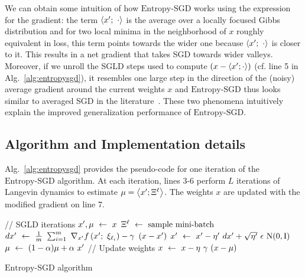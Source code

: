 \documentclass[10pt]{article}
\newcommand{\entropysgd}{\mathrm{Entropy}\textrm{-}\mathrm{SGD}}
\newcommand{\minibatch}[1]{\Xi^{#1}}
\begin{document}
We can obtain some intuition of how $\entropysgd$ works using the expression for the gradient: the term $\left\langle x';\ \cdot\right\rangle$ is the average over a locally focused Gibbs distribution and for two local minima in the neighborhood of $x$ roughly equivalent in loss, this term points towards the wider one because $\left\langle x';\ \cdot\right\rangle$ is closer to it. This results in a net gradient that takes SGD towards wider valleys. Moreover, if we unroll the SGLD steps used to compute $\left(x - \left\langle x'; \cdot\right\rangle\right)$ (cf. line 5 in Alg.~\ref{alg:entropysgd}), it resembles one large step in the direction of the (noisy) average gradient around the current weights $x$ and $\entropysgd$ thus looks similar to averaged SGD in the literature~\citep{polyak1992acceleration,bottou2012stochastic}. These two phenomena intuitively explain the improved generalization performance of $\entropysgd$.

\subsection{Algorithm and Implementation details}
\label{ss:alg}

Alg.~\ref{alg:entropysgd} provides the pseudo-code for one iteration of the $\entropysgd$ algorithm. At each iteration, lines $3$-$6$ perform $L$ iterations of Langevin dynamics to estimate $\mu = \ag{x'; \minibatch{\ell}}$. The weights $x$ are updated with the modified gradient on line $7$.

\begin{center}
\begin{minipage}{0.7 \textwidth}
\IncMargin{0.04in}
\begin{algorithm}[H]

    \small
    \vspace{0.1in}
    \nonl \textrm{// SGLD iterations}\;
    \vspace{0.025in}
    $x', \mu \ \leftarrow\  x$\;
    {
        $\minibatch{\ell} \la \textrm{sample mini-batch}$\;
        \vspace{0.03in}
        $dx' \ \leftarrow\  \frac{1}{m}\ \sum_{i=1}^m\ \nabla_{x'} f\left(x';\ \xi_{\ell_i}\right) - \gamma\ \left(x - x'\right)$\;
        \vspace{0.03in}
        $x' \la x' - \eta'\ dx' + \sqrt{\eta'}\ \e\ \trm{N}(0, \trm{I})$\;
        \vspace{0.03in}
        $\mu \ \leftarrow\  (1-\alpha) \mu + \alpha\ x'$\;
    }
    \vspace{0.1in}
    \nonl \textrm{// Update weights}\;
    \vspace{0.03in}
    $x \la x - \eta\ \g\ (x-\mu)$
    \caption{$\entropysgd$ algorithm}
    \label{alg:entropysgd}
\end{algorithm}
\DecMargin{0.04in}
\end{minipage}
\end{center}
\end{document}
